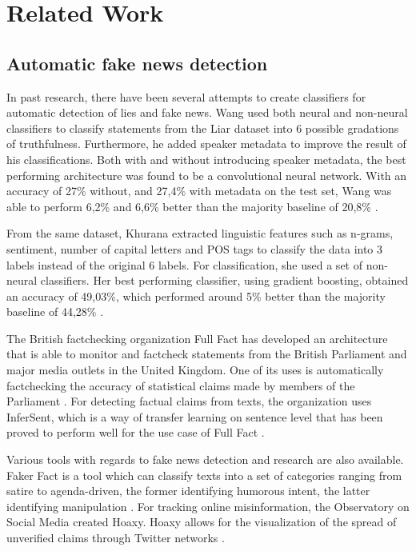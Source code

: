 \section{Related Work}
\subsection{Automatic fake news detection}
In past research, there have been several attempts to create classifiers for automatic detection of lies and fake news. 
Wang used both neural and non-neural classifiers to classify statements from the Liar dataset into 6 possible gradations of truthfulness. 
Furthermore, he added speaker metadata to improve the result of his classifications.
Both with and without introducing speaker metadata, the best performing architecture was found to be a convolutional neural network. 
With an accuracy of 27\% without, and 27,4\% with metadata on the test set, Wang was able to perform 6,2\% and 6,6\% better than the majority baseline of 20,8\% \cite{wang2018}.

From the same dataset, Khurana extracted linguistic features such as n-grams, sentiment, number of capital letters and POS tags to classify the data into 3 labels instead of the original 6 labels. 
For classification, she used a set of non-neural classifiers. 
Her best performing classifier, using gradient boosting, obtained an accuracy of 49,03\%, which performed around 5\% better than the majority baseline of 44,28\% \cite{khurana2017}.

The British factchecking organization Full Fact has developed an architecture that is able to monitor and factcheck statements from the British Parliament and major media outlets in the United Kingdom. 
One of its uses is automatically factchecking the accuracy of statistical claims made by members of the Parliament \cite{babakar2016}.
For detecting factual claims from texts, the organization uses InferSent, which is a way of transfer learning on sentence level that has been proved to perform well for the use case of Full Fact \cite{pydata2018}.

Various tools with regards to fake news detection and research are also available. 
Faker Fact is a tool which can classify texts into a set of categories ranging from satire to agenda-driven, the former identifying humorous intent, the latter identifying manipulation \cite{fakerfact}. 
For tracking online misinformation, the Observatory on Social Media created Hoaxy. 
Hoaxy allows for the visualization of the spread of unverified claims through Twitter networks \cite{shao2016}.

